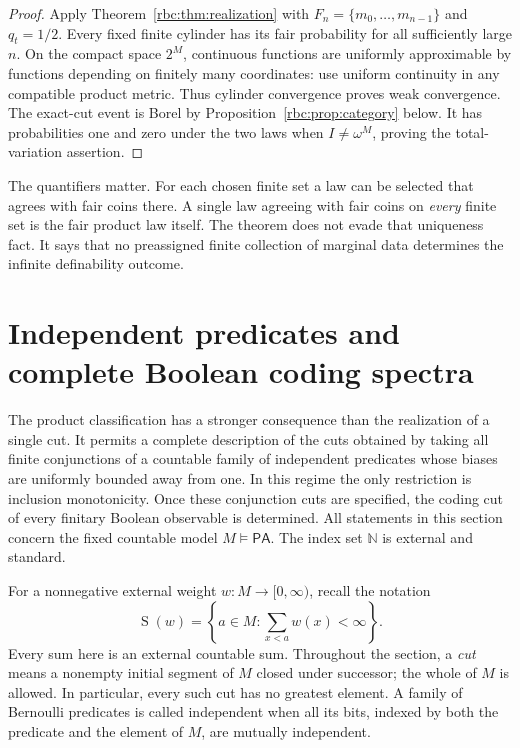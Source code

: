 \documentclass[11pt]{article}
\numberwithin{equation}{section}
\theoremstyle{definition}
\theoremstyle{remark}
\newcommand{\N}{\mathbb N}
\newcommand{\PA}{\mathsf{PA}}
\newcommand{\std}{\omega^M}
\newcommand{\SumCut}{\operatorname{S}}
\begin{document}
\begin{proof}
Apply Theorem~\ref{rbc:thm:realization} with
$F_n=\{m_0,\ldots,m_{n-1}\}$ and $q_t=1/2$. Every fixed finite cylinder
has its fair probability for all sufficiently large $n$. On the compact
space $2^M$, continuous functions are uniformly approximable by functions
depending on finitely many coordinates: use uniform continuity in any
compatible product metric. Thus cylinder convergence proves weak
convergence. The exact-cut event is Borel by
Proposition~\ref{rbc:prop:category} below. It has probabilities one and zero
under the two laws when $I\ne\std$, proving the total-variation assertion.
\end{proof}

The quantifiers matter. For each chosen finite set a law can be selected
that agrees with fair coins there. A single law agreeing with fair coins
on \emph{every} finite set is the fair product law itself. The theorem
does not evade that uniqueness fact. It says that no preassigned finite
collection of marginal data determines the infinite definability outcome.


\section{Independent predicates and complete Boolean coding spectra}
\label{rbc:bs:section}

The product classification has a stronger consequence than the realization of
a single cut.  It permits a complete description of the cuts obtained by taking
all finite conjunctions of a countable family of independent predicates
whose biases are uniformly bounded away from one.  In this regime the
only restriction is inclusion monotonicity.  Once these conjunction cuts are
specified, the coding cut of every finitary Boolean observable is determined.
All statements in this section concern the fixed countable model
$M\models\PA$.  The index set $\N$ is external and standard.

For a nonnegative external weight $w:M\to[0,\infty)$, recall the notation
\[
  \SumCut(w)
  =\left\{a\in M:\sum_{x<a}w(x)<\infty\right\}.
\]
Every sum here is an external countable sum.  Throughout the section, a
\emph{cut} means a nonempty initial segment of $M$ closed under successor;
the whole of $M$ is allowed.  In particular, every such cut has no greatest
element.  A family of Bernoulli predicates is called independent when all its
bits, indexed by both the predicate and the element of $M$, are mutually
independent.
\end{document}
